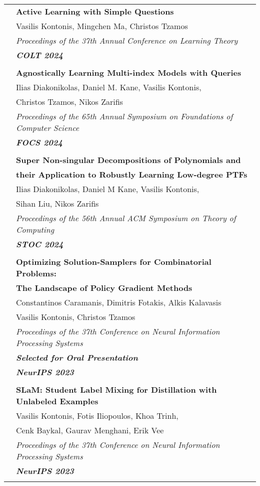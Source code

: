 \documentclass[letterpaper,11pt,oneside]{article}
\begin{document}
\begin{longtable}{@{} l l}
 &\textbf{Active Learning with Simple Questions} \\
 & Vasilis Kontonis, Mingchen Ma, Christos Tzamos \\
 & \emph{Proceedings of the 37th Annual Conference on Learning Theory} \\
 & \emph{\textbf{COLT 2024}} \\
 & \\

 &\textbf{Agnostically Learning Multi-index Models with Queries}\\
 & Ilias Diakonikolas, Daniel M. Kane, Vasilis Kontonis,\\
 & Christos Tzamos, Nikos Zarifis \\
 & \emph{Proceedings of the 65th Annual Symposium on Foundations of Computer Science} \\
 & \emph{\textbf{FOCS 2024}} \\
 & \\


 &\textbf{Super Non-singular Decompositions of Polynomials and}\\
 &\textbf{their Application to Robustly Learning Low-degree PTFs} \\
 & Ilias Diakonikolas, Daniel M Kane, Vasilis Kontonis, \\
 & Sihan Liu, Nikos Zarifis\\
 & \emph{Proceedings of the 56th Annual ACM Symposium on Theory of Computing}\\
 & \emph{\textbf{STOC 2024}} \\
 & \\

 &\textbf{Optimizing Solution-Samplers for Combinatorial Problems:}\\
 &\textbf{The Landscape of Policy Gradient Methods}\\
 & Constantinos Caramanis, Dimitris Fotakis, Alkis Kalavasis\\
 & Vasilis Kontonis, Christos Tzamos\\
 & \emph{Proceedings of the 37th Conference on Neural Information Processing Systems} \\
 & \emph{\textbf{Selected for Oral Presentation}} \\
 & \emph{\textbf{NeurIPS 2023}} \\
 & \\

 &\textbf{SLaM: Student Label Mixing for Distillation with Unlabeled Examples}\\
 & Vasilis Kontonis, Fotis Iliopoulos,  Khoa Trinh, \\
 & Cenk Baykal, Gaurav Menghani, Erik Vee\\ 
 & \emph{Proceedings of the 37th Conference on Neural Information Processing Systems} \\
 & \emph{\textbf{NeurIPS 2023}} \\
 & \\


\end{longtable}
\end{document}
